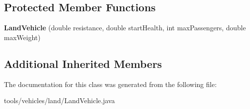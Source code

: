 \subsection*{Protected Member Functions}
\begin{DoxyCompactItemize}
\item 
{\bfseries Land\+Vehicle} (double resistance, double start\+Health, int max\+Passengers, double max\+Weight)\hypertarget{classtools_1_1vehicles_1_1land_1_1_land_vehicle_a34b3618fbec0b9f30e3c8009949ac5e5}{}\label{classtools_1_1vehicles_1_1land_1_1_land_vehicle_a34b3618fbec0b9f30e3c8009949ac5e5}

\end{DoxyCompactItemize}
\subsection*{Additional Inherited Members}


The documentation for this class was generated from the following file\+:\begin{DoxyCompactItemize}
\item 
tools/vehicles/land/Land\+Vehicle.\+java\end{DoxyCompactItemize}
